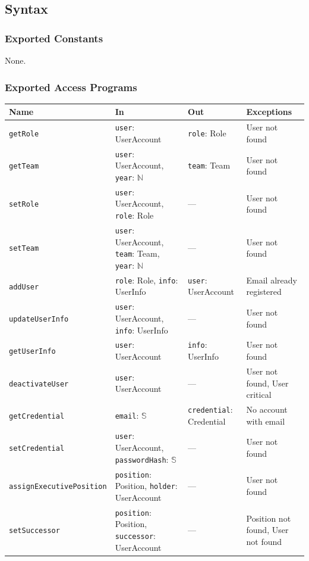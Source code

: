 \documentclass[12pt, titlepage]{article}
\begin{document}
\subsection{Syntax}

\subsubsection{Exported Constants}
None.

\subsubsection{Exported Access Programs}
\begin{tabularx}{\textwidth}{p{4.1cm} p{4.2cm} p{2.5cm} X}
\toprule
\textbf{Name} & \textbf{In} & \textbf{Out} & \textbf{Exceptions} \\
\midrule
\texttt{getRole} & \texttt{user}: UserAccount & \texttt{role}: Role & User not found \\
\texttt{getTeam} & \texttt{user}: UserAccount, \texttt{year}: $\mathbb{N}$ & \texttt{team}: Team & User not found \\
\texttt{setRole} & \texttt{user}: UserAccount, \texttt{role}: Role & --- & User not found \\
\texttt{setTeam} & \texttt{user}: UserAccount, \texttt{team}: Team, \texttt{year}: $\mathbb{N}$ & --- & User not found \\
\texttt{addUser} & \texttt{role}: Role, \texttt{info}: UserInfo & \texttt{user}: UserAccount & Email already registered \\
\texttt{updateUserInfo} & \texttt{user}: UserAccount, \texttt{info}: UserInfo & --- & User not found \\
\texttt{getUserInfo} & \texttt{user}: UserAccount & \texttt{info}: UserInfo & User not found \\
\texttt{deactivateUser} & \texttt{user}: UserAccount & --- & User not found, User critical \\
\texttt{getCredential} & \texttt{email}: $\mathbb{S}$ & \texttt{credential}: Credential & No account with email \\
\texttt{setCredential} & \texttt{user}: UserAccount, \texttt{passwordHash}: $\mathbb{S}$ & --- & User not found \\
\texttt{assign\allowbreak ExecutivePosition} & \texttt{position}: Position, \texttt{holder}: UserAccount & --- & User not found \\
\texttt{setSuccessor} & \texttt{position}: Position, \texttt{successor}: UserAccount & --- & Position not found, User not found \\

\end{tabularx}
\end{document}
